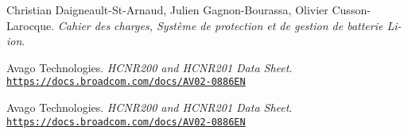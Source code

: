 \documentclass[12pt,letterpaper]{article}
\begin{document}
	
	\hypersetup{pageanchor=false}
	
	\newpage
	\hypersetup{pageanchor=true}
	\tableofcontents


	
	
	
	
	
	

	
		
	
	
	

	
	

	
	
	
	


	\begin{thebibliography}{10}
	
	Christian Daigneault-St-Arnaud, Julien Gagnon-Bourassa, Olivier Cusson-Larocque. \textit{Cahier des charges, Système de protection et de gestion de batterie Li-ion}. \par	
	
	Avago Technologies. \textit{HCNR200 and HCNR201 Data Sheet}.\\ \texttt{\url{https://docs.broadcom.com/docs/AV02-0886EN}}\par

	Avago Technologies. \textit{HCNR200 and HCNR201 Data Sheet}.\\ \texttt{\url{https://docs.broadcom.com/docs/AV02-0886EN}}\par	
	
	
	\end{thebibliography}	
	
\end{document}
